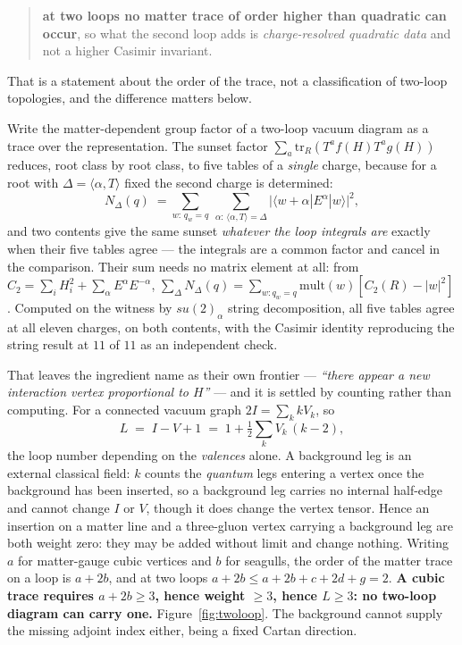 \documentclass[11pt,a4paper]{article}
\begin{document}
\begin{quote}
\textbf{at two loops no matter trace of order higher than quadratic can occur}, so what the second
loop adds is \emph{charge-resolved quadratic data} and not a higher Casimir invariant.
\end{quote}

\noindent
That is a statement about the order of the trace, not a classification of two-loop topologies, and
the difference matters below.

Write the matter-dependent group factor of a two-loop vacuum diagram as a trace over the
representation. The sunset factor $\sum_a\mathrm{tr}_R(T^a f(H) T^a g(H))$ reduces, root class by
root class, to five tables of a \emph{single} charge, because for a root with
$\Delta=\langle\alpha,T\rangle$ fixed the second charge is determined:
\[
  N_\Delta(q)\;=\!\!\sum_{w:\,q_w=q}\ \sum_{\alpha:\,\langle\alpha,T\rangle=\Delta}
  \bigl|\langle w+\alpha|E^\alpha|w\rangle\bigr|^2 ,
\]
and two contents give the same sunset \emph{whatever the loop integrals are} exactly when their five
tables agree --- the integrals are a common factor and cancel in the comparison. Their sum needs no
matrix element at all: from $C_2=\sum_i H_i^2+\sum_\alpha E^\alpha E^{-\alpha}$,
$\sum_\Delta N_\Delta(q)=\sum_{w:q_w=q}\mathrm{mult}(w)[C_2(R)-|w|^2]$. Computed on the witness by
$su(2)_\alpha$ string decomposition, all five tables agree at all eleven charges, on both contents,
with the Casimir identity reproducing the string result at $11$ of $11$ as an independent check.

That leaves the ingredient \cite{HMTY} name as their own frontier --- \emph{``there appear a new
interaction vertex proportional to $H$''} --- and it is settled by counting rather than computing.
For a connected vacuum graph $2I=\sum_k kV_k$, so
\[
  L \;=\; I-V+1 \;=\; 1+\tfrac12\sum_k V_k\,(k-2),
\]
the loop number depending on the \emph{valences} alone. A background leg is an external classical
field: $k$ counts the \emph{quantum} legs entering a vertex once the background has been inserted,
so a background leg carries no internal half-edge and cannot change $I$ or $V$, though it does
change the vertex tensor. Hence an insertion on a matter line and a three-gluon vertex
carrying a background leg are both weight zero: they may be added without limit and change nothing.
Writing $a$ for matter-gauge cubic vertices and $b$ for seagulls, the order of the matter trace on a
loop is $a+2b$, and at two loops $a+2b\le a+2b+c+2d+g=2$. \textbf{A cubic trace requires $a+2b\ge3$,
hence weight $\ge3$, hence $L\ge3$: no two-loop diagram can carry one.} Figure~\ref{fig:twoloop}.
The background cannot supply the missing adjoint index either, being a fixed Cartan direction.
\end{document}
